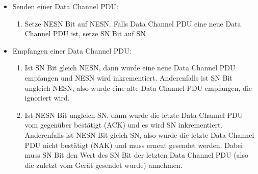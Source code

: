 \begin{itemize}
    \item Senden einer Data Channel PDU:
    \begin{enumerate}
        \item Setze NESN Bit auf NESN. Falls Data Channel PDU eine neue Data Channel PDU ist, setze SN Bit auf SN
    \end{enumerate}
    \item Empfangen einer Data Channel PDU:
    \begin{enumerate}
        \item Ist SN Bit gleich NESN, dann wurde eine neue Data Channel PDU empfangen und NESN wird inkrementiert. Anderenfalls ist SN Bit ungleich NESN, also wurde eine alte Data Channel PDU empfangen, die ignoriert wird.
        \item Ist NESN Bit ungleich SN, dann wurde die letzte Data Channel PDU vom gegenüber bestätigt (ACK) und es wird SN inkrementiert. Anderenfalls ist NESN Bit gleich SN, also wurde die letzte Data Channel PDU nicht bestätigt (NAK) und muss erneut gesendet werden. Dabei muss SN Bit den Wert des SN Bit der letzten Data Channel PDU (also die zuletzt vom Gerät gesendet wurde) annehmen.
    \end{enumerate}
\end{itemize}


